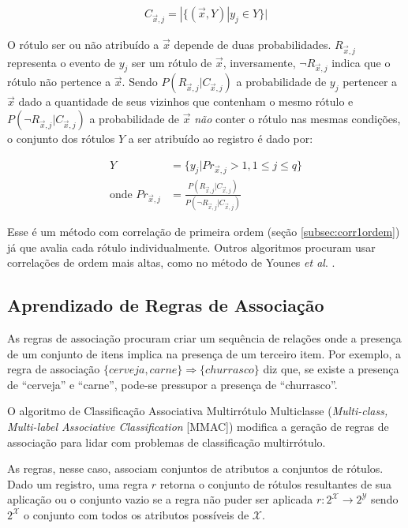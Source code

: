 \documentclass[runningheads,a4paper]{llncs}
\begin{document}
\begin{align*}
C_{\vec{x}, j} = |\{ (\vec{x}, Y) | y_j \in Y \}|
\end{align*}

O rótulo ser ou não atribuído a $\vec{x}$ depende de duas probabilidades. $R_{\vec{x},j}$ representa o evento de $y_j$ ser um rótulo de $\vec{x}$, inversamente, $\neg R_{\vec{x}, j}$ indica que o rótulo não pertence a $\vec{x}$. Sendo $P(R_{\vec{x}, j} | C_{\vec{x}, j})$ a probabilidade de $y_j$ pertencer a $\vec{x}$ dado a quantidade de seus vizinhos que contenham o mesmo rótulo e $P(\neg R_{\vec{x}, j} | C_{\vec{x}, j})$ a probabilidade de $\vec{x}$ \textit{não} conter o rótulo nas mesmas condições, o conjunto dos rótulos $Y$ a ser atribuído ao registro é dado por:

\begin{align*}
Y &= \{ y_j | Pr_{\vec{x}, j} > 1, 1 \leq j \leq q \} \\
\text{onde } Pr_{\vec{x}, j} &= \frac{P( R_{\vec{x}, j} | C_{\vec{x}, j})}{P(\neg R_{\vec{x}, j} | C_{\vec{x}, j})}
\end{align*}

Esse é um método com correlação de primeira ordem (seção \ref{subsec:corr1ordem}) já que avalia cada rótulo individualmente. Outros algoritmos procuram usar correlações de ordem mais altas, como no método de Younes \textit{et al}. \cite{Younes2011-sf}.

\subsection{Aprendizado de Regras de Associação}

As regras de associação procuram criar um sequência de relações onde a presença de um conjunto de itens implica na presença de um terceiro item. Por exemplo, a regra de associação $\{ cerveja, carne \} \Rightarrow \{ churrasco \}$ diz que, se existe a presença de \enquote{cerveja} e \enquote{carne}, pode-se pressupor a presença de \enquote{churrasco}.

O algoritmo de Classificação Associativa Multirrótulo Multiclasse (\textit{Multi-class, Multi-label Associative Classification} [MMAC]) \cite{Thabtah2004-vz} modifica a geração de regras de associação para lidar com problemas de classificação multirrótulo.

As regras, nesse caso, associam conjuntos de atributos a conjuntos de rótulos.
Dado um registro, uma regra $r$ retorna o conjunto de rótulos resultantes de sua aplicação ou o conjunto vazio se a regra não puder ser aplicada $r : 2^\mathcal{X} \to 2^\mathcal{Y}$ sendo $2^\mathcal{X}$ o conjunto com todos os atributos possíveis de $\mathcal{X}$. 
\end{document}
